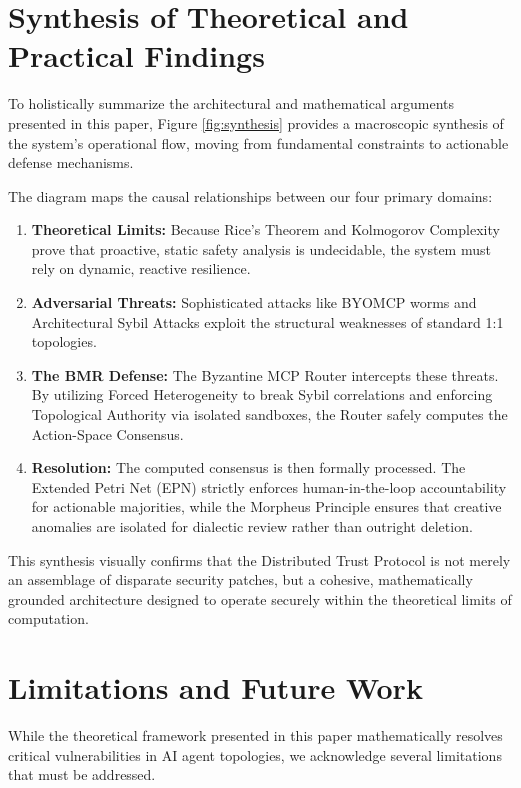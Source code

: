 \documentclass[a4paper,11pt,twocolumn]{article}
\theoremstyle{definition}
\theoremstyle{plain}
\begin{document}
\section{Synthesis of Theoretical and Practical Findings}

To holistically summarize the architectural and mathematical arguments presented in this paper, Figure \ref{fig:synthesis} provides a macroscopic synthesis of the system's operational flow, moving from fundamental constraints to actionable defense mechanisms.

The diagram maps the causal relationships between our four primary domains:
\begin{enumerate}
    \item \textbf{Theoretical Limits:} Because Rice's Theorem and Kolmogorov Complexity prove that proactive, static safety analysis is undecidable, the system must rely on dynamic, reactive resilience.
    \item \textbf{Adversarial Threats:} Sophisticated attacks like BYOMCP worms and Architectural Sybil Attacks exploit the structural weaknesses of standard 1:1 topologies.
    \item \textbf{The BMR Defense:} The Byzantine MCP Router intercepts these threats. By utilizing Forced Heterogeneity to break Sybil correlations and enforcing Topological Authority via isolated sandboxes, the Router safely computes the Action-Space Consensus.
    \item \textbf{Resolution:} The computed consensus is then formally processed. The Extended Petri Net (EPN) strictly enforces human-in-the-loop accountability for actionable majorities, while the Morpheus Principle ensures that creative anomalies are isolated for dialectic review rather than outright deletion.
\end{enumerate}
This synthesis visually confirms that the Distributed Trust Protocol is not merely an assemblage of disparate security patches, but a cohesive, mathematically grounded architecture designed to operate securely within the theoretical limits of computation.

\section{Limitations and Future Work}

While the theoretical framework presented in this paper mathematically resolves critical vulnerabilities in AI agent topologies, we acknowledge several limitations that must be addressed.
\end{document}

